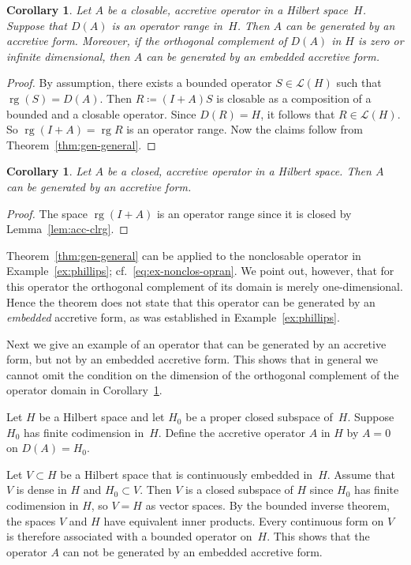 \documentclass[a4paper,oneside,12pt]{amsart}
\theoremstyle{plain}
\newtheorem{corollary}[theorem]{Corollary}
\theoremstyle{definition}
\newenvironment{example}
{\pushQED{\qed}

\examplex}
{\popQED\endexamplex}
\begin{document}
\begin{corollary}\label{cor:gen-general}
Let $A$ be a closable, accretive operator in a Hilbert space~$H$.
Suppose that $D(A)$ is an operator range in~$H$.
Then $A$ can be generated by an accretive form.
Moreover, if the orthogonal complement of $D(A)$ in $H$ is zero or infinite dimensional, then $A$ can be generated by an embedded accretive form.
\end{corollary}
\begin{proof}
By assumption, there exists a bounded operator $S\in{\mathcal{L}}(H)$ such that $\operatorname{rg}(S)=D(A)$.
Then $R\coloneqq (I+A)S$ is closable as a composition of a bounded and a closable operator.
Since $D(R)=H$, it follows that $R\in{\mathcal{L}}(H)$. So $\operatorname{rg}(I+A)=\operatorname{rg} R$ is an operator range.
Now the claims follow from Theorem~\ref{thm:gen-general}.
\end{proof}
\begin{corollary}\label{cor:gen-closed}
Let $A$ be a closed, accretive operator in a Hilbert space.
Then $A$ can be generated by an accretive form. 
\end{corollary}
\begin{proof}
The space $\operatorname{rg}(I+A)$ is an operator range since it is closed by Lemma~\ref{lem:acc-clrg}.
\end{proof}
Theorem~\ref{thm:gen-general}
can be applied to the nonclosable operator in Example~\ref{ex:phillips}; cf.~\eqref{eq:ex-nonclos-opran}.
We point out, however, that for this operator the orthogonal complement of its domain is merely one-dimensional.
Hence the theorem does not state that this operator can be generated by an \emph{embedded} accretive form, as was established in Example~\ref{ex:phillips}.

Next we give an example of an operator that can be generated
by an accretive form, but not by an embedded accretive form.
This shows that in general we cannot omit the condition on
the dimension of the orthogonal complement of the operator domain in Corollary~\ref{cor:gen-general}.
\begin{example}
Let $H$ be a Hilbert space and let $H_0$ be a proper closed subspace of~$H$. 
Suppose $H_0$ has finite codimension in~$H$. Define the accretive operator $A$ in $H$ by $A=0$ on $D(A)=H_0$.

Let $V\subset H$ be a Hilbert space that is continuously embedded
in~$H$. Assume that $V$ is dense in $H$ and $H_0\subset V$. Then
$V$ is a closed subspace of $H$ since $H_0$ has finite
codimension in $H$, so $V=H$ as vector spaces. By the bounded inverse theorem,
the spaces $V$ and $H$ have equivalent inner products.
Every continuous form on $V$ is therefore associated with a
bounded operator on~$H$.
This shows that the operator $A$ can not be generated by an embedded accretive form.
\end{example} 
\end{document}
